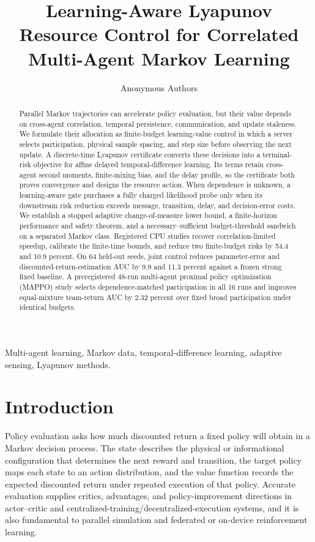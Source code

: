 \documentclass[journal]{IEEEtran}
\title{Learning-Aware Lyapunov Resource Control for Correlated Multi-Agent Markov Learning}
\author{Anonymous Authors}
\begin{document}
\maketitle
\begin{abstract}
Parallel Markov trajectories can accelerate policy evaluation, but their value depends on cross-agent correlation, temporal persistence, communication, and update staleness.
We formulate their allocation as finite-budget learning-value control in which a server selects participation, physical sample spacing, and step size before observing the next update.
A discrete-time Lyapunov certificate converts these decisions into a terminal-risk objective for affine delayed temporal-difference learning.
Its terms retain cross-agent second moments, finite-mixing bias, and the delay profile, so the certificate both proves convergence and designs the resource action.
When dependence is unknown, a learning-aware gate purchases a fully charged likelihood probe only when its downstream risk reduction exceeds message, transition, delay, and decision-error costs.
We establish a stopped adaptive change-of-measure lower bound, a finite-horizon performance and safety theorem, and a necessary--sufficient budget-threshold sandwich on a separated Markov class.
Registered CPU studies recover correlation-limited speedup, calibrate the finite-time bounds, and reduce two finite-budget risks by 54.4 and 10.9 percent.
On 64 held-out seeds, joint control reduces parameter-error and discounted-return-estimation AUC by 9.9 and 11.3 percent against a frozen strong fixed baseline.
A preregistered 48-run multi-agent proximal policy optimization (MAPPO) study selects dependence-matched participation in all 16 runs and improves equal-mixture team-return AUC by 2.32 percent over fixed broad participation under identical budgets.
\end{abstract}
\begin{IEEEkeywords}
Multi-agent learning, Markov data, temporal-difference learning, adaptive sensing, Lyapunov methods.
\end{IEEEkeywords}

\section{Introduction}
Policy evaluation asks how much discounted return a fixed policy will obtain in a Markov decision process.
The state describes the physical or informational configuration that determines the next reward and transition, the target policy maps each state to an action distribution, and the value function records the expected discounted return under repeated execution of that policy.
Accurate evaluation supplies critics, advantages, and policy-improvement directions in actor--critic and centralized-training/decentralized-execution systems, and it is also fundamental to parallel simulation and federated or on-device reinforcement learning.
\end{document}
